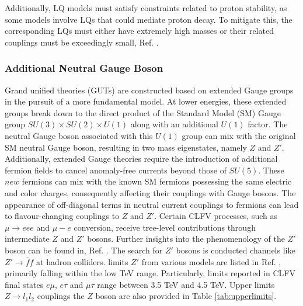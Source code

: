 
Additionally, LQ models must satisfy constraints related to proton stability, as some models involve LQs that could mediate proton decay. To mitigate this, the corresponding LQs must either have extremely high masses or their related couplings must be exceedingly small, Ref. \cite{DORSNER20161}.
\subsubsection{Additional Neutral Gauge Boson}
Grand unified theories (GUTs) are constructed based on extended Gauge groups in the pursuit of a more fundamental model. At lower energies, these extended  groups  break down to the direct product of the Standard Model (SM) Gauge group $SU(3) \times SU(2) \times U(1)$ along with an additional $U(1)$ factor. The neutral {\red Gauge} boson associated with this $U(1)$ group can mix with the original SM neutral Gauge boson, resulting in two mass eigenstates, namely $Z$ and $Z'$. Additionally, extended Gauge theories require the introduction of additional fermion fields to cancel anomaly-free currents beyond those of $SU(5)$. These $new$ fermions can mix with the known SM fermions possessing the same electric and color charges, consequently affecting their couplings with Gauge bosons. The appearance of off-diagonal terms in neutral current couplings to fermions can lead to flavour-changing couplings to $Z$ and $Z'$. Certain CLFV processes, such as $\mu \rightarrow eee$ and $\mu-e$ conversion, receive tree-level contributions through intermediate $Z$ and $Z'$ bosons. Further insights into the phenomenology of the $Z'$ boson can be found in, Ref. \cite{Leike_1999}. The search for  $Z'$ bosons is conducted  channels like $Z' \rightarrow \bar{f}f$ at hadron colliders.  limits  $Z'$  from various  models are listed in Ref. \cite{zyla}, primarily falling within the low TeV range. Particularly,  limits reported in CLFV final states $e\mu$, $e\tau$ and $\mu\tau$ range  between 3.5 TeV and 4.5 TeV. Upper limits  $Z \rightarrow l_1 l_2$ couplings  the  $Z$ boson are also provided in Table \ref{tab:upperlimits}.

